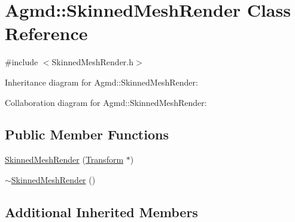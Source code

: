 \hypertarget{class_agmd_1_1_skinned_mesh_render}{\section{Agmd\+:\+:Skinned\+Mesh\+Render Class Reference}
\label{class_agmd_1_1_skinned_mesh_render}
}


{\ttfamily \#include $<$Skinned\+Mesh\+Render.\+h$>$}



Inheritance diagram for Agmd\+:\+:Skinned\+Mesh\+Render\+:


Collaboration diagram for Agmd\+:\+:Skinned\+Mesh\+Render\+:
\subsection*{Public Member Functions}
\begin{DoxyCompactItemize}
\item 
\hyperlink{class_agmd_1_1_skinned_mesh_render_a523cbfe5cf779afaf0f50216854cf968}{Skinned\+Mesh\+Render} (\hyperlink{class_agmd_maths_1_1_transform}{Transform} $\ast$)
\item 
\hyperlink{class_agmd_1_1_skinned_mesh_render_a2e47d8794a8f3e5a4331e78e699ad858}{$\sim$\+Skinned\+Mesh\+Render} ()
\end{DoxyCompactItemize}
\subsection*{Additional Inherited Members}


